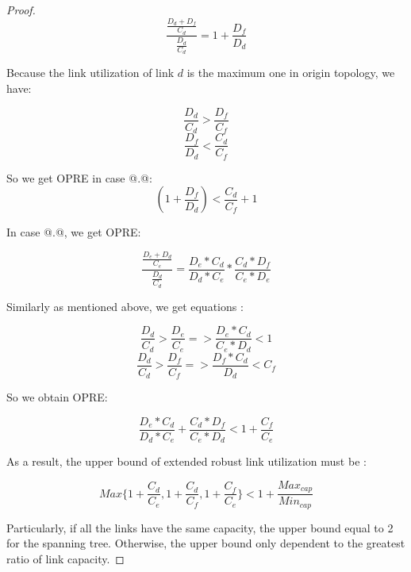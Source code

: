 \documentclass[conference]{IEEEtran}
\makeatletter
\newcommand{\Rmnum}[1]{\expandafter\@slowromancap\romannumeral #1@}
\makeatother
\begin{document}
\begin{proof}
\begin{equation}
    \frac{\frac{D_d + D_f}{C_d}}{\frac{D_d}{C_d}} = 1 + \frac{D_f}{D_d}
\end{equation}

Because the link utilization of link $d$ is the maximum one in origin topology, we have:

\begin{equation}
    \frac{D_d}{C_d} > \frac{D_f}{C_f} 
\end{equation}
\begin{equation}
    \frac{D_f}{D_d} < \frac{C_d}{C_f} 
\end{equation}

So we get OPRE in case \Rmnum{2}.\Rmnum{1}:
\begin{equation}
    (1 + \frac{D_f}{D_d}) < \frac{C_d}{C_f} + 1
\end{equation}

In case \Rmnum{2}.\Rmnum{2}, we get OPRE:

\begin{equation}
    \frac{\frac{D_e + D_d}{C_e}}{\frac{D_d}{C_d}} = \frac{D_e * C_d}{D_d * C_e} * \frac{C_d * D_f}{C_e * D_e}
\end{equation}

Similarly as mentioned above, we get equations :

\begin{equation}
    \frac{D_d}{C_d} > \frac{D_e}{C_e} => \frac{D_e * C_d}{C_e * D_d} < 1 
\end{equation}
\begin{equation}
    \frac{D_d}{C_d} > \frac{D_f}{C_f} => \frac{D_f * C_d}{D_d} < C_f
\end{equation}

So we obtain OPRE:

\begin{equation}
    \frac{D_e * C_d}{D_d * C_e} + \frac{C_d * D_f}{C_e * D_d} < 1 + \frac{C_f}{C_e}
\end{equation}

As a result, the upper bound of extended robust link utilization must be :

\begin{equation}
    Max\{1 + \frac{C_d}{C_e}, 1 + \frac{C_d}{C_f}, 1 + \frac{C_f}{C_e}\} < 1 + \frac{Max_{cap}}{Min_{cap}}
\end{equation}

Particularly, if all the links have the same capacity, the upper bound equal to 2 for the spanning tree. Otherwise, the 
upper bound only dependent to the greatest ratio of link capacity.

\end{proof}
\end{document}
